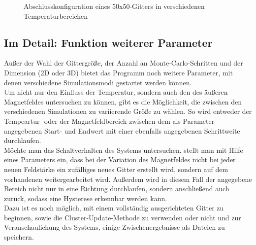 \begin{figure}[H]
	\centering
	\subfigure[$T<<T_{c}$]{
}	
	\subfigure[$T<T_{c}$]{
}		
	\subfigure[$T>T_{c}$]{
}		
	\caption{Abschlusskonfiguration eines 50x50-Gitters in verschiedenen Temperaturbereichen}
	\label{mp2dconfig}
\end{figure}


\subsection{Im Detail: Funktion weiterer Parameter}
\label{met4}

Außer der Wahl der Gittergröße, der Anzahl an Monte-Carlo-Schritten und der Dimension (2D oder 3D) bietet das Programm noch weitere Parameter, mit denen verschiedene Simulationsmodi gestartet werden können.\\
Um nicht nur den Einfluss der Temperatur, sondern auch den des äußeren Magnetfeldes untersuchen zu können, gibt es die Möglichkeit, die zwischen den verschiedenen Simulationen zu variierende Größe zu wählen. So wird entweder der Tempeartur- oder der Magnetfeldbereich zwischen dem als Parameter angegebenen Start- und Endwert mit einer ebenfalls angegebenen Schrittweite durchlaufen.\\
Möchte man das Schaltverhalten des Systems untersuchen, stellt man mit Hilfe eines Parameters ein, dass bei der Variation des Magnetfeldes nicht bei jeder neuen Feldstärke ein zufälliges neues Gitter erstellt wird, sondern auf dem vorhandenen weitergearbeitet wird. Außerdem wird in diesem Fall der angegebene Bereich nicht nur in eine Richtung durchlaufen, sondern anschließend auch zurück, sodass eine Hysterese erkennbar werden kann.\\
Dazu ist es noch möglich, mit einem vollständig ausgerichteten Gitter zu beginnen, sowie die Cluster-Update-Methode zu verwenden oder nicht und zur Veranschaulichung des Systems, einige Zwischenergebnisse als Dateien zu speichern.

